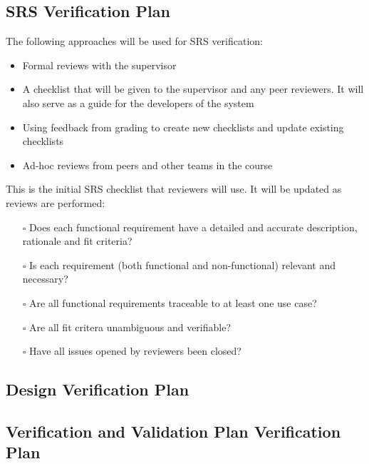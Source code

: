 \documentclass[12pt, titlepage]{article}
\begin{document}

\subsection{SRS Verification Plan}
The following approaches will be used for SRS verification:
\begin{itemize}
  \item Formal reviews with the supervisor
  \item A checklist that will be given to the supervisor and any peer reviewers. It will also
  serve as a guide for the developers of the system
  \item Using feedback from grading to create new checklists and update existing checklists
  \item Ad-hoc reviews from peers and other teams in the course
\end{itemize}
This is the initial SRS checklist that reviewers will use. It will be updated as reviews are performed:
\begin{enumerate}
  \item[$\square$] Does each functional requirement have a detailed and accurate description, rationale and fit criteria?
  \item[$\square$] Is each requirement (both functional and non-functional) relevant and necessary?
  \item[$\square$] Are all functional requirements traceable to at least one use case?
  \item[$\square$] Are all fit critera unambiguous and verifiable?
  \item[$\square$] Have all issues opened by reviewers been closed? 
\end{enumerate}

\subsection{Design Verification Plan}




\subsection{Verification and Validation Plan Verification Plan}
\end{document}
